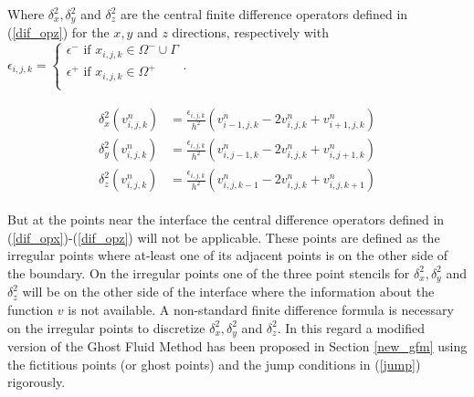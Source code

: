  Where $\delta_x^2,\delta_y^2$ and $\delta_z^2$ are the central finite difference operators defined in (\ref{dif_opz}) for the $x,y$ and $z$ directions, respectively with $\epsilon_{i,j,k}= \displaystyle\begin{cases}
	\epsilon^- \text{ if } x_{i,j,k}\in\Omega^- \cup \Gamma \\
	\epsilon^+ \text{ if } x_{i,j,k}\in\Omega^+\\
	\end{cases}$.

 \begin{eqnarray}
 \begin{aligned}
	\delta_x^2\left(v_{i,j,k}^n\right)&= \frac{\epsilon_{i,j,k}}{h^2} \left(v_{i-1,j,k}^n-2v_{i,j,k}^n+v_{i+1,j,k}^n\right) \\ \label{dif_opx}
	\delta_y^2\left(v_{i,j,k}^n\right)&= \frac{\epsilon_{i,j,k}}{h^2} \left(v_{i,j-1,k}^n-2v_{i,j,k}^n+v_{i,j+1,k}^n\right)\\ %
	\delta_z^2\left(v_{i,j,k}^n\right)&= \frac{\epsilon_{i,j,k}}{h^2} \left(v_{i,j,k-1}^n-2v_{i,j,k}^n+v_{i,j,k+1}^n\right) \label{dif_opz}
\end{aligned}
\end{eqnarray}

But at the  points near the interface the central difference operators defined in (\ref{dif_opx})-(\ref{dif_opz}) will not be applicable. These points are defined as the irregular points where at-least one of its adjacent points is on the other side of the boundary. On the irregular points one of the three point stencils for $\delta_x^2,\delta_y^2$ and $\delta_z^2$  will be on the other side of the interface where the information about the function $v$ is not available. A non-standard finite difference formula is necessary on the irregular points to discretize $\delta_x^2,\delta_y^2$ and $\delta_z^2$.  In this regard a modified version of the Ghost Fluid Method has been proposed in Section \ref{new_gfm} using the fictitious points (or ghost points) and the jump conditions in (\ref{jump}) rigorously.

